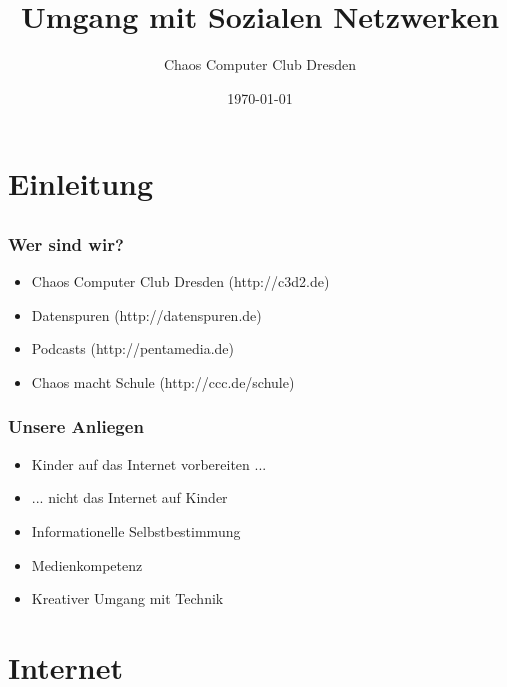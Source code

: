 \documentclass{beamer}
\title{Umgang mit Sozialen Netzwerken}
\author{Chaos Computer Club Dresden}
\date{\today}
\begin{document}
\maketitle

\section{Einleitung}
\subsection{}

\begin{frame}
  \frametitle{Wer sind wir?}
  \begin{itemize}
    \item<2-> Chaos Computer Club Dresden (http://c3d2.de)
    \item<3-> Datenspuren (http://datenspuren.de)
    \item<4-> Podcasts (http://pentamedia.de)
    \item<5-> Chaos macht Schule (http://ccc.de/schule)
  \end{itemize}
\end{frame}

\begin{frame}
  \frametitle{Unsere Anliegen}
  \begin{itemize}
    \item<2-> Kinder auf das Internet vorbereiten ...
    \item<3-> ... nicht das Internet auf Kinder
    \item<4-> Informationelle Selbstbestimmung
    \item<5-> Medienkompetenz
    \item<6-> Kreativer Umgang mit Technik
  \end{itemize}
\end{frame}

\frame{\tableofcontents[hideallsubsections]}

\section{Internet}
\subsection{}
\end{document}
